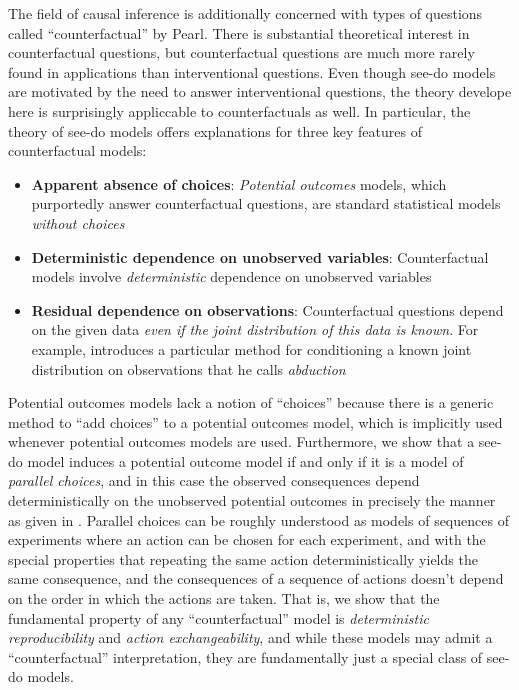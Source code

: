 The field of causal inference is additionally concerned with types of questions called ``counterfactual'' by Pearl. There is substantial theoretical interest in counterfactual questions, but counterfactual questions are much more rarely found in applications than interventional questions. Even though see-do models are motivated by the need to answer interventional questions, the theory develope here is surprisingly appliccable to counterfactuals as well. In particular, the theory of see-do models offers explanations for three key features of counterfactual models:
\begin{itemize}
    \item \textbf{Apparent absence of choices}: \emph{Potential outcomes} models, which purportedly answer counterfactual questions, are standard statistical models \emph{without choices} \citep{rubin_causal_2005}
    \item \textbf{Deterministic dependence on unobserved variables}: Counterfactual models involve \emph{deterministic} dependence on unobserved variables \citep{pearl_causality:_2009,rubin_causal_2005,richardson2013single}
    \item \textbf{Residual dependence on observations}: Counterfactual questions depend on the given data \emph{even if the joint distribution of this data is known}. For example, \citet{pearl_causality:_2009} introduces a particular method for conditioning a known joint distribution on observations that he calls \emph{abduction}
\end{itemize}

Potential outcomes models lack a notion of ``choices'' because there is a generic method to ``add choices'' to a potential outcomes model, which is implicitly used whenever potential outcomes models are used. Furthermore, we show that a see-do model induces a potential outcome model if and only if it is a model of \emph{parallel choices}, and in this case the observed consequences depend deterministically on the unobserved potential outcomes in precisely the manner as given in \citet{rubin_causal_2005}. Parallel choices can be roughly understood as models of sequences of experiments where an action can be chosen for each experiment, and with the special properties that repeating the same action deterministically yields the same consequence, and the consequences of a sequence of actions doesn't depend on the order in which the actions are taken. That is, we show that the fundamental property of any ``counterfactual'' model is \emph{deterministic reproducibility} and \emph{action exchangeability}, and while these models may admit a ``counterfactual'' interpretation, they are fundamentally just a special class of see-do models.

